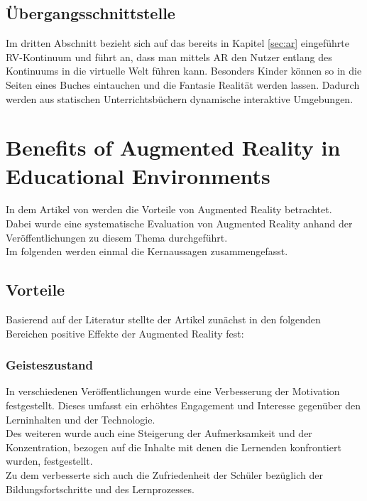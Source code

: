 \subsection{Übergangsschnittstelle}
Im dritten Abschnitt bezieht sich \citeauthor{billinghurst:ar-in-education} auf das bereits in Kapitel \ref{sec:ar} eingeführte RV-Kontinuum und führt an, dass man mittels AR den Nutzer entlang des Kontinuums in die virtuelle Welt führen kann. Besonders Kinder können so in die Seiten eines Buches eintauchen und die Fantasie Realität werden lassen. Dadurch werden aus statischen Unterrichtsbüchern dynamische interaktive Umgebungen. \citep[S. 3-4]{billinghurst:ar-in-education}


\section{Benefits of Augmented Reality in Educational Environments}\label{sec:diegmann-benefits-ar}
In dem Artikel \citep{diegmann:benefits-ar} von \citeauthor{diegmann:benefits-ar} werden die Vorteile von Augmented Reality betrachtet. \\
Dabei wurde eine systematische Evaluation von Augmented Reality anhand der Veröffentlichungen zu diesem Thema durchgeführt. \\
Im folgenden werden einmal die Kernaussagen zusammengefasst.

\subsection{Vorteile}
Basierend auf der Literatur stellte der Artikel zunächst in den folgenden Bereichen positive Effekte der Augmented Reality fest:

\subsubsection{Geisteszustand}
In verschiedenen Veröffentlichungen wurde eine Verbesserung der Motivation festgestellt. Dieses umfasst ein erhöhtes Engagement und Interesse gegenüber den Lerninhalten und der Technologie.\\
Des weiteren wurde auch eine Steigerung der Aufmerksamkeit und der Konzentration, bezogen auf die Inhalte mit denen die Lernenden konfrontiert wurden, festgestellt.\\
Zu dem verbesserte sich auch die Zufriedenheit der Schüler bezüglich der Bildungsfortschritte und des Lernprozesses. 
\citep[Kapitel 4.1]{diegmann:benefits-ar}

